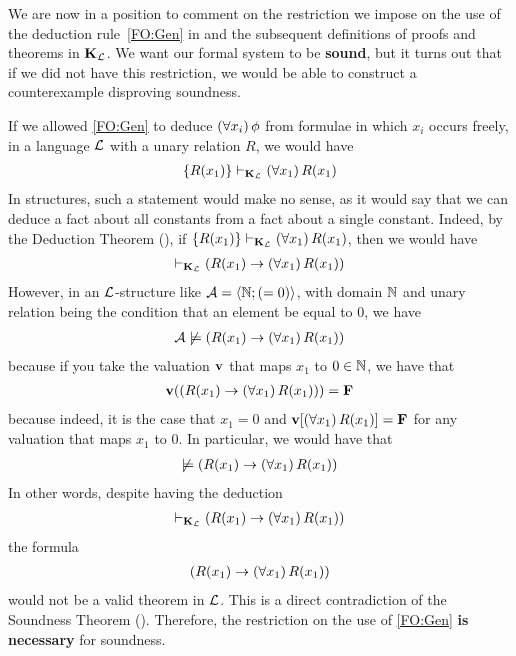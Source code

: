 We are now in a position to comment on the restriction we impose on the use of the deduction rule~\ref{FO:Gen} in  and the subsequent definitions of proofs and theorems in $\mathbf{K}_{\mathcal{L}}$. We want our formal system to be \textbf{sound}, but it turns out that if we did not have this restriction, we would be able to construct a counterexample disproving soundness.
\begin{boxcexample}\label{Ch2:CEg:Gen_Restriction}
    If we allowed \ref{FO:Gen} to deduce $\left( \forall x_i \right)\phi$ from formulae in which $x_i$ occurs freely, in a language $\mathcal{L}$ with a unary relation $R$, we would have
    \begin{align*}
        \left\{ R\!\left( x_1 \right) \right\} \vdash_{\mathbf{K}_{\mathcal{L}}} \left( \forall x_1 \right)R\!\left( x_1 \right)
    \end{align*}
    In structures, such a statement would make no sense, as it would say that we can deduce a fact about all constants from a fact about a single constant. Indeed, by the Deduction Theorem (), if $\left\{ R\!\left( x_1 \right) \right\} \vdash_{\mathbf{K}_{\mathcal{L}}} \left( \forall x_1 \right)R\!\left( x_1 \right)$, then we would have
    \begin{align*}
        \vdash_{\mathbf{K}_{\mathcal{L}}} \left( R\!\left( x_1 \right) \to \left( \forall x_1 \right)R\!\left( x_1 \right) \right)
    \end{align*}
    However, in an $\mathcal{L}$-structure like $\mathcal{A} = \left\langle \mathbb{N}; \left( = 0 \right) \right\rangle$, with domain $\mathbb{N}$ and unary relation being the condition that an element be equal to $0$, we have
    \begin{align*}
        \mathcal{A} \not\models \left( R\!\left( x_1 \right) \to \left( \forall x_1 \right)R\!\left( x_1 \right) \right)
    \end{align*}
    because if you take the valuation $\mathbf{v}$ that maps $x_1$ to $0 \in \mathbb{N}$, we have that
    \begin{align*}
        \mathbf{v}\!\left( \left( R\!\left( x_1 \right) \to \left( \forall x_1 \right)R\!\left( x_1 \right) \right) \right) = \mathbf{F}
    \end{align*}
    because indeed, it is the case that $x_1 = 0$ and $\mathbf{v}\!\left[ \left( \forall x_1 \right)R\!\left( x_1 \right) \right] = \mathbf{F}$ for any valuation that maps $x_1$ to $0$. In particular, we would have that
    \begin{align*}
        \not\models \left( R\!\left( x_1 \right) \to \left( \forall x_1 \right)R\!\left( x_1 \right) \right)
    \end{align*}
    In other words, despite having the deduction
    \begin{align*}
        \vdash_{\mathbf{K}_{\mathcal{L}}} \left( R\!\left( x_1 \right) \to \left( \forall x_1 \right)R\!\left( x_1 \right) \right)
    \end{align*}
    the formula
    \begin{align*}
        \left( R\!\left( x_1 \right) \to \left( \forall x_1 \right)R\!\left( x_1 \right) \right)
    \end{align*}
    would not be a valid theorem in $\mathcal{L}$. This is a direct contradiction of the Soundness Theorem (). Therefore, the restriction on the use of \ref{FO:Gen} \textbf{is necessary} for soundness.
\end{boxcexample}

